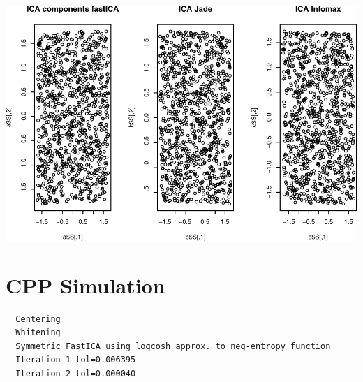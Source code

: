 \documentclass[12pt,twoside]{amherstthesis}
\begin{document}
  \begin{center}\includegraphics{ICA_Stats_Comps_files/figure-latex/unnamed-chunk-4-2} \end{center}
  
  \section{CPP Simulation}\label{cpp-simulation}
  
  \begin{Shaded}
  \begin{Highlighting}[]
  \StringTok{ }\NormalTok{,} \NormalTok{, } \NormalTok{, } \NormalTok{, }
                \NormalTok{, } \NormalTok{, } \NormalTok{, }
                \NormalTok{, } \NormalTok{)}
  \end{Highlighting}
  \end{Shaded}
  
  \begin{verbatim}
  Centering
  Whitening
  Symmetric FastICA using logcosh approx. to neg-entropy function
  Iteration 1 tol=0.006395
  Iteration 2 tol=0.000040
  \end{verbatim}
  
\end{document}
